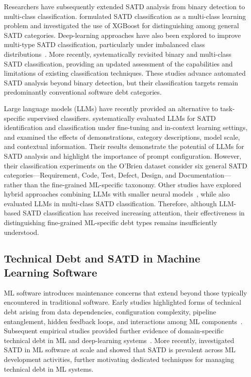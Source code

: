 \documentclass[acmsmall,screen,review,anonymous]{acmart}
\begin{document}
Researchers have subsequently extended SATD analysis from binary detection to multi-class classification. \citet{chen2021multiclass} formulated SATD classification as a multi-class learning problem and investigated the use of XGBoost for distinguishing among general SATD categories. Deep-learning approaches have also been explored to improve multi-type SATD classification, particularly under imbalanced class distributions~\cite{yu2023detecting}. More recently, \citet{ARCELLIFONTANA2025107862} systematically revisited binary and multi-class SATD classification, providing an updated assessment of the capabilities and limitations of existing classification techniques. These studies advance automated SATD analysis beyond binary detection, but their classification targets remain predominantly conventional software debt categories.

Large language models (LLMs) have recently provided an alternative to task-specific supervised classifiers. \citet{sheikhaei2024empirical} systematically evaluated LLMs for SATD identification and classification under fine-tuning and in-context learning settings, and examined the effects of demonstrations, category descriptions, model scale, and contextual information. Their results demonstrate the potential of LLMs for SATD analysis and highlight the importance of prompt configuration. However, their classification experiments on the O'Brien dataset consider six general SATD categories---Requirement, Code, Test, Defect, Design, and Documentation---rather than the fine-grained ML-specific taxonomy. Other studies have explored hybrid approaches combining LLMs with smaller neural models~\cite{li2025large}, while \citet{ARCELLIFONTANA2025107862} also evaluated LLMs in multi-class SATD classification. Therefore, although LLM-based SATD classification has received increasing attention, their effectiveness in distinguishing fine-grained ML-specific debt types remains insufficiently understood.

\subsection{Technical Debt and SATD in Machine Learning Software}

ML software introduces maintenance concerns that extend beyond those typically encountered in traditional software. Early studies highlighted forms of technical debt arising from data dependencies, configuration complexity, pipeline entanglement, hidden feedback loops, and interactions among ML components~\cite{sculley2014machine,sculley2015hidden,breck2017ml}. Subsequent empirical studies provided further evidence of domain-specific technical debt in ML and deep-learning systems~\cite{alahdab2019empirical,liu2020using}. More recently, \citet{bhatia2023empirical} investigated SATD in ML software at scale and showed that SATD is prevalent across ML development activities, further motivating dedicated techniques for managing technical debt in ML systems.
\end{document}
